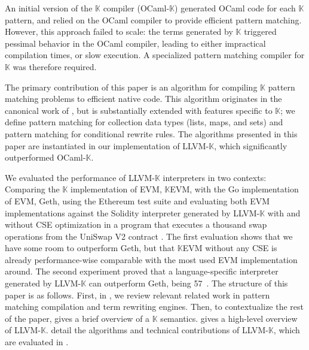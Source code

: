 \documentclass{article}
\theoremstyle{definition}
\newcommand{\K}{$\mathbb{K}$\xspace}
\newcommand{\KL}{LLVM-\K}
\newcommand{\KO}{OCaml-\K}
\begin{document}
An initial version of the \K compiler (\KO) generated OCaml code for
each \K pattern, and relied on the OCaml compiler to provide efficient pattern
matching. However, this approach failed to scale: the terms generated by \K
triggered pessimal behavior in the OCaml compiler, leading to either impractical
compilation times, or slow execution. A specialized
pattern matching compiler for \K was therefore required.


The primary contribution of this paper is an algorithm for compiling \K pattern
matching problems to efficient native code. This algorithm originates in the
canonical work of \citet{Maranget2008}, but is substantially extended with
features specific to \K; we define pattern matching for collection data types
(lists, maps, and sets) and pattern matching for conditional rewrite rules.
The algorithms presented in this paper are instantiated in our implementation of
\KL \cite{anonymous_2022_7298780}, which significantly outperformed \KO.



We evaluated the performance of \KL interpreters in two contexts: Comparing the \K implementation of EVM, {\K}EVM, with the Go implementation of EVM, Geth, using the Ethereum test suite \cite{ethereum-tests} and evaluating both EVM implementations against the Solidity interpreter generated by \KL with and without CSE optimization in a program that executes a thousand swap operations from the UniSwap V2 contract \cite{Adams2020UniswapVC}. The first evaluation shows that we have some room to outperform Geth, but that {\K}EVM without any CSE is already performance-wise comparable with the most used EVM implementation around. The second experiment proved that a language-specific interpreter generated by \KL can outperform Geth, being 57\
.   
The structure of this paper is as follows. First, in , we
review relevant related work in pattern matching compilation and term rewriting
engines. Then, to contextualize the rest of the paper,  \Cref{sec:imp} gives a
brief overview of a \K semantics.
 gives a high-level overview of \KL.  detail the algorithms
and technical contributions of \KL, which are evaluated in \Cref{sec:eval}.
\end{document}
